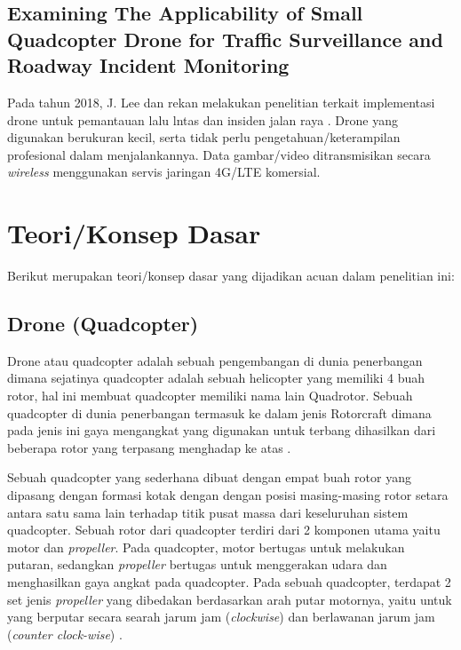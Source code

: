 \subsection{Examining The Applicability of Small Quadcopter Drone for Traffic Surveillance and Roadway Incident Monitoring}
Pada tahun 2018, J. Lee dan rekan melakukan penelitian terkait implementasi drone untuk pemantauan lalu lntas dan insiden jalan raya \cite{LeeSmallDroneSurveillance}. Drone yang digunakan berukuran kecil, serta tidak perlu pengetahuan/keterampilan profesional dalam menjalankannya. Data gambar/video ditransmisikan secara \emph{wireless} menggunakan servis jaringan 4G/LTE komersial.

\section{Teori/Konsep Dasar}
Berikut merupakan teori/konsep dasar yang dijadikan acuan dalam penelitian ini:

\subsection{Drone (Quadcopter)}
Drone atau quadcopter adalah sebuah pengembangan di dunia penerbangan dimana sejatinya quadcopter adalah sebuah helicopter yang memiliki 4 buah rotor, hal ini membuat quadcopter memiliki nama lain Quadrotor. Sebuah quadcopter di dunia penerbangan termasuk ke dalam jenis Rotorcraft dimana pada jenis ini gaya mengangkat yang digunakan untuk terbang dihasilkan dari beberapa rotor yang terpasang menghadap ke atas \cite{LuukkonenQuadcopter}.

Sebuah quadcopter yang sederhana dibuat dengan empat buah rotor yang dipasang dengan formasi kotak dengan dengan posisi masing-masing rotor setara antara satu sama lain terhadap titik pusat massa dari keseluruhan sistem quadcopter. Sebuah rotor dari quadcopter terdiri dari 2 komponen utama yaitu motor dan \emph{propeller}. Pada quadcopter, motor bertugas untuk melakukan putaran, sedangkan \emph{propeller} bertugas untuk menggerakan udara dan menghasilkan gaya angkat pada quadcopter. Pada sebuah quadcopter, terdapat 2 set jenis \emph{propeller} yang dibedakan berdasarkan arah putar motornya, yaitu untuk yang berputar secara searah jarum jam (\emph{clockwise}) dan berlawanan jarum jam (\emph{counter clock-wise}) \cite{GopalakrishnanQuadcopter}. 

